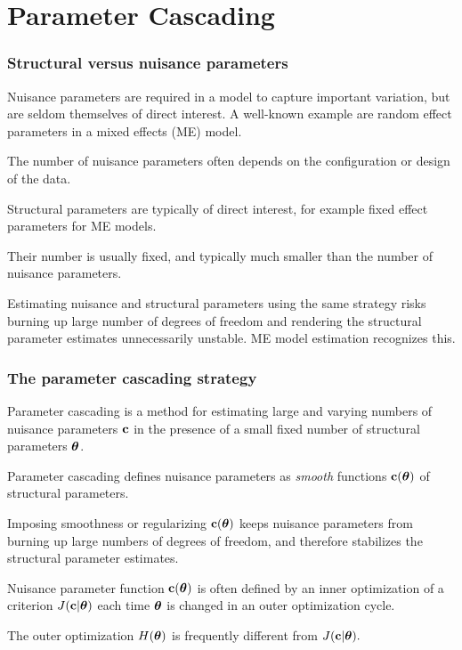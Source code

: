 \documentclass[11pt]{beamer}
\begin{document}
\section{Parameter Cascading}


\begin{frame}

\frametitle{Structural versus nuisance parameters}

\bi
  \item Nuisance parameters are required in a model to capture important variation, but are seldom themselves of direct interest.  A well-known example are random effect parameters in a mixed effects (ME) model.
  \item The number of nuisance parameters often depends on the configuration or design of the data.
  \item Structural parameters are typically of direct interest, for example fixed effect parameters for ME models.
  \item Their number is usually fixed, and typically much smaller than the number of nuisance parameters.
  \item Estimating nuisance and structural parameters using the same strategy risks burning up large number of degrees of freedom and rendering the structural parameter estimates unnecessarily unstable.  ME model estimation recognizes this.
\ei

\end{frame}


\begin{frame}

\frametitle{The parameter cascading strategy}

\bi
  \item Parameter cascading is a method for estimating large and varying numbers of nuisance parameters $\mbox{\bf c}$ in the presence of a small fixed number of structural parameters $\mbox{\boldmath${\theta}$}$.
  \item Parameter cascading defines nuisance parameters as \emph{smooth} functions $\mbox{\bf c}(\mbox{\boldmath${\theta}$})$ of structural parameters.
  \item Imposing smoothness or regularizing $\mbox{\bf c}(\mbox{\boldmath${\theta}$})$ keeps nuisance parameters from burning up large numbers of degrees of freedom, and therefore stabilizes the structural parameter estimates.
  \item Nuisance parameter function $\mbox{\bf c}(\mbox{\boldmath${\theta}$})$ is often defined by an inner optimization of a criterion $J(\mbox{\bf c}|\mbox{\boldmath${\theta}$})$ each time $\mbox{\boldmath${\theta}$}$ is changed in an outer optimization cycle.
  \item The outer optimization $H(\mbox{\boldmath${\theta}$})$ is frequently different from $J(\mbox{\bf c}|\mbox{\boldmath${\theta}$}).$
\ei

\end{frame}
\end{document}

